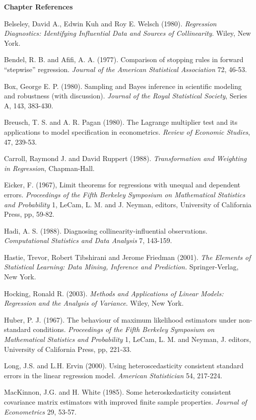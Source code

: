 \textbf{Chapter References}
\begin{multicols}{2}

Belseley, David A., Edwin Kuh and Roy E. Welsch (1980).
\textit{Regression Diagnostics: Identifying Influential Data and
Sources of Collinearity}. Wiley, New York.

Bendel, R. B. and Afifi, A. A. (1977). Comparison of stopping rules
in forward ``stepwise'' regression. \textit{Journal of the American
Statistical Association} 72, 46-53.

Box, George E. P. (1980). Sampling and Bayes inference in scientific
modeling and robustness (with discussion). \textit{Journal of the
Royal Statistical Society}, Series A, 143, 383-430.

Breusch, T. S. and A. R. Pagan (1980).  The Lagrange multiplier test
and its applications to model specification in econometrics.
\textit{Review of Economic Studies}, 47, 239-53.

Carroll, Raymond J. and David Ruppert (1988). \textit{Transformation
and Weighting in Regression}, Chapman-Hall.

Eicker, F. (1967), Limit theorems for regressions with unequal and
dependent errors.  \textit{Proceedings of the Fifth Berkeley
Symposium on Mathematical Statistics and Probability} 1, LeCam, L.
M. and J. Neyman, editors, University of California Press, pp,
59-82.

Hadi, A. S. (1988). Diagnosing collinearity-influential
observations. \textit{Computational Statistics and Data Analysis} 7,
143-159.

Hastie, Trevor, Robert Tibshirani and Jerome Friedman (2001).
\textit{The Elements of Statistical Learning: Data Mining, Inference
and Prediction.} Springer-Verlag, New York.

Hocking, Ronald R. (2003). \textit{Methods and Applications of
Linear Models: Regression and the Analysis of Variance}. Wiley, New
York.

Huber, P. J. (1967). The behaviour of maximum likelihood estimators
under non-standard conditions. \textit{Proceedings of the Fifth
Berkeley Symposium on Mathematical Statistics and Probability} 1,
LeCam, L. M. and Neyman, J. editors, University of California Press,
pp, 221-33.

Long, J.S. and L.H. Ervin (2000). Using heteroscedasticity
consistent standard errors in the linear regression model.
\textit{American Statistician} 54, 217-224.

MacKinnon, J.G. and H. White (1985). Some heteroskedasticity
consistent covariance matrix estimators with improved finite sample
properties. \textit{Journal of Econometrics} 29, 53-57.


\end{multicols}
